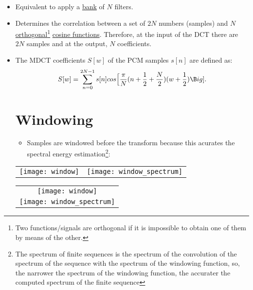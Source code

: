 \begin{itemize}
\item Equivalent to apply a
  \href{http://en.wikipedia.org/wiki/Filter_bank}{bank} of $N$
  filters.
\item Determines the correlation between a set of $2N$ numbers
  (samples) and $N$
  \href{http://en.wikipedia.org/wiki/Orthogonality}{orthogonal}\footnote{Two
    functions/signals are orthogonal if it is impossible to obtain one
    of them by means of the other.}
  \href{http://guru.multimedia.cx/mdct/}{cosine functions}. Therefore,
  at the input of the DCT there are $2N$ samples and at the output,
  $N$ coefficients.
\item The MDCT coefficients $S[w]$ of the PCM samples $s[n]$ are
  defined as:
\begin{equation}
  S[w] =
  \sum_{n=0}^{2N-1}s[n]cos\Big[\frac{\pi}{N}(n+\frac{1}{2}+\frac{N}{2})(w+\frac{1}{2})\B
    ig].
  \label{eq:MDCT}
\end{equation}

\section{Windowing}

\begin{itemize}
\item Samples are windowed before the transform because this acurates
  the spectral energy estimation\footnote{The spectrum of finite
    sequences is the spectrum of the convolution of the spectrum of
    the sequence with the spectrum of the windowing function, so, the
    narrower the spectrum of the windowing function, the accurater the
    computed spectrum of the finite sequence}:
\end{itemize}

\begin{center}
\ifx \HCode\Undef

  \begin{tabular}{cc}
    \texttt{[image: window]} &
    \texttt{[image: window\_spectrum]}
  \end{tabular}

\else

  \begin{tabular}{c}
    \texttt{[image: window]} \\
    \texttt{[image: window\_spectrum]}
  \end{tabular}
\fi
\end{center}


\end{itemize}
